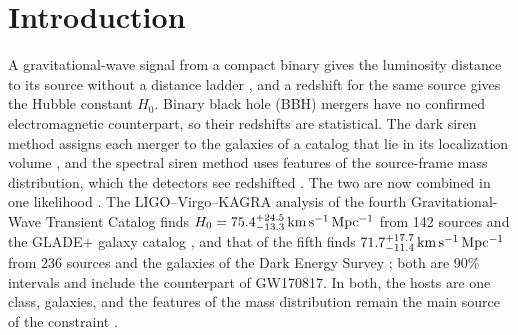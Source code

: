 \documentclass[aps,prd,reprint,twocolumn,superscriptaddress,nofootinbib,floatfix]{revtex4-2}
\newcommand{\kms}{{\rm km\,s^{-1}\,Mpc^{-1}}}
\begin{document}
\section{Introduction}
\label{sec:intro}

A gravitational-wave signal from a compact binary gives the luminosity
distance to its source without a distance ladder
\cite{Schutz:1986gp,Holz:2005df}, and a redshift for the same source gives
the Hubble constant $H_0$. Binary black hole (BBH) mergers have no confirmed
electromagnetic counterpart, so their redshifts are statistical. The dark
siren method assigns each merger to the galaxies of a catalog that lie in its
localization volume
\cite{Schutz:1986gp,DelPozzo:2011vcw,LIGOScientific:2018gmd,DES:2019ccw,Gray:2019ksv,DES:2020nay,Finke:2021aom,Palmese:2021mjm,Gair:2022zsa},
and the spectral siren method uses features of the source-frame mass
distribution, which the detectors see redshifted
\cite{Taylor:2011fs,Farr:2019twy,Ezquiaga:2022zkx,Mastrogiovanni:2021wsd}.
The two are now combined in one likelihood
\cite{Mastrogiovanni:2023emh,Gray:2023wgj,Borghi:2023opd}. The
LIGO--Virgo--KAGRA analysis of the fourth Gravitational-Wave Transient
Catalog finds $H_0=75.4^{+24.5}_{-13.3}\,\kms$ from 142 sources and the
GLADE+ galaxy catalog \cite{LIGOScientific:2025jau,Dalya:2021ewn}, and that of
the fifth finds $71.7^{+17.7}_{-11.4}\,\kms$ from 236 sources and the
galaxies of the Dark Energy Survey \cite{LIGOScientific:2026uyd}; both are
90\% intervals and include the counterpart of GW170817. In both, the hosts
are one class, galaxies, and the features of the mass distribution remain the
main source of the constraint \cite{LIGOScientific:2026uyd}.
\end{document}
